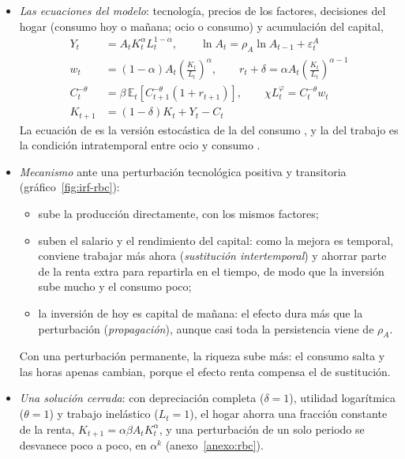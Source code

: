 \documentclass[11pt]{article}
\begin{document}
\begin{itemize}
\item \emph{Las ecuaciones del modelo}: tecnología, precios de los factores, decisiones del hogar (consumo hoy o mañana; ocio o consumo) y acumulación del capital,
  \begin{align}
  Y_t&=A_tK_t^{\alpha}L_t^{1-\alpha},\qquad \ln A_t=\rho_A\ln A_{t-1}+\varepsilon^A_t \label{eq:rbc-tecnologia}\\
  w_t&=(1-\alpha)A_t\left(\tfrac{K_t}{L_t}\right)^{\alpha},\qquad r_t+\delta=\alpha A_t\left(\tfrac{K_t}{L_t}\right)^{\alpha-1} \label{eq:rbc-precios}\\
  C_t^{-\theta}&=\beta\,\mathbb{E}_t\!\left[C_{t+1}^{-\theta}(1+r_{t+1})\right],\qquad \chi L_t^{\varphi}=C_t^{-\theta}w_t \label{eq:rbc-hogar}\\
  K_{t+1}&=(1-\delta)K_t+Y_t-C_t \label{eq:rbc-acumulacion}
  \end{align}
  La ecuación de  es la versión estocástica de la del consumo , y la del trabajo es la condición intratemporal entre ocio y consumo .
\item \emph{Mecanismo} ante una perturbación tecnológica positiva y transitoria (gráfico~\ref{fig:irf-rbc}):
  \begin{itemize}
  \item sube la producción directamente, con los mismos factores;
  \item suben el salario y el rendimiento del capital: como la mejora es temporal, conviene trabajar más ahora (\emph{sustitución intertemporal}) y ahorrar parte de la renta extra para repartirla en el tiempo, de modo que la inversión sube mucho y el consumo poco;
  \item la inversión de hoy es capital de mañana: el efecto dura más que la perturbación (\emph{propagación}), aunque casi toda la persistencia viene de $\rho_A$.
  \end{itemize}
  Con una perturbación permanente, la riqueza sube más: el consumo salta y las horas apenas cambian, porque el efecto renta compensa el de sustitución.
\item \emph{Una solución cerrada}\nocite{McCallum1989Real}: con depreciación completa ($\delta=1$), utilidad logarítmica ($\theta=1$) y trabajo inelástico ($L_t=1$), el hogar ahorra una fracción constante de la renta, $K_{t+1}=\alpha\beta A_tK_t^{\alpha}$, y una perturbación de un solo periodo se desvanece poco a poco, en $\alpha^k$ (anexo~\ref{anexo:rbc}).
\end{itemize}
\end{document}
